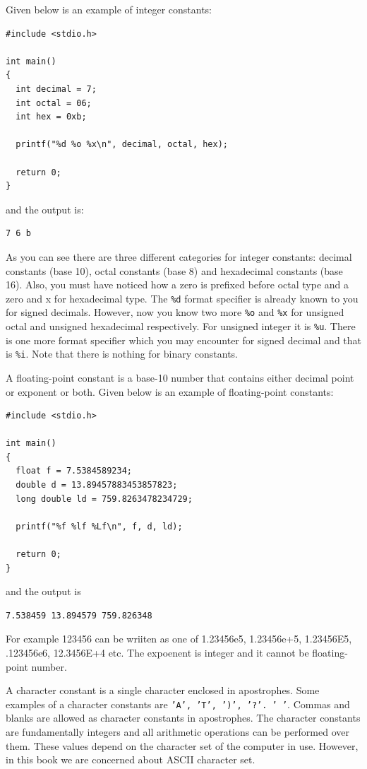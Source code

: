 Given below is an example of integer constants:

\begin{verbatim}
#include <stdio.h>

int main()
{
  int decimal = 7;
  int octal = 06;
  int hex = 0xb;

  printf("%d %o %x\n", decimal, octal, hex);

  return 0;
}
\end{verbatim}

and the output is:

\begin{verbatim}
7 6 b
\end{verbatim}

As you can see there are three different categories for integer constants:
decimal constants (base 10), octal constants (base 8) and hexadecimal constants
(base 16). Also, you must have noticed how a zero is prefixed before octal type
and a zero and x for hexadecimal type. The \texttt{\%d} format specifier is
already known to you for signed decimals. However, now you know two more
\texttt{\%o} and \texttt{\%x} for unsigned octal and unsigned hexadecimal
respectively. For unsigned integer it is \texttt{\%u}. There is one more format
specifier which you may encounter for signed decimal and that is
\texttt{\%i}. Note that there is nothing for binary constants.

A floating-point constant is a base-10 number that contains either decimal
point or exponent or both. Given below is an example of floating-point
constants:

\begin{verbatim}
#include <stdio.h>

int main()
{
  float f = 7.5384589234;
  double d = 13.89457883453857823;
  long double ld = 759.8263478234729;

  printf("%f %lf %Lf\n", f, d, ld);

  return 0;
}
\end{verbatim}

and the output is

\begin{verbatim}
7.538459 13.894579 759.826348
\end{verbatim}

For example 123456 can be wriiten as one of 1.23456e5, 1.23456e+5, 1.23456E5,
.123456e6, 12.3456E+4 etc. The expoenent is integer and it cannot be
floating-point number.

A character constant is a single character enclosed in apostrophes. Some
examples of a character constants are \texttt{'A', 'T', ')', '?'. ' '}. Commas
and blanks are allowed as character constants in apostrophes. The character
constants are fundamentally integers and all arithmetic operations can be
performed over them. These values depend on the character set of the computer
in use. However, in this book we are concerned about ASCII character set.

